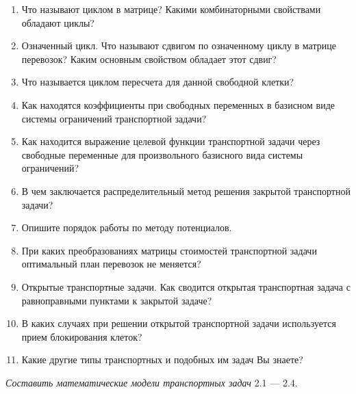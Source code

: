 {\begin{enumerate}
\item  Что называют циклом в матрице? Какими комбинаторными свойствами обладают циклы?

\item  Означенный цикл. Что называют сдвигом по означенному циклу в матрице перевозок? Каким основным свойством обладает этот сдвиг?

\item  Что называется циклом пересчета для данной свободной клетки?

\item  Как находятся коэффициенты при свободных переменных в базисном виде системы ограничений транспортной задачи?

\item  Как находится выражение целевой функции транспортной задачи через свободные переменные для произвольного базисного вида системы ограничений?

\item  В чем заключается распределительный метод решения закрытой транспортной задачи?

\item  Опишите порядок работы по методу потенциалов.

\item  При каких преобразованиях матрицы стоимостей транспортной задачи оптимальный план перевозок не меняется?

\item  Открытые транспортные задачи. Как сводится открытая транспортная задача с равноправными пунктами к закрытой задаче?

\item  В каких случаях при решении открытой транспортной задачи используется прием блокирования клеток?

\item  Какие другие типы транспортных и подобных им задач Вы знаете?
\\
\end{enumerate}
\textit{Составить математические модели транспортных задач} 2.1 --- 2.4.
\\

}
